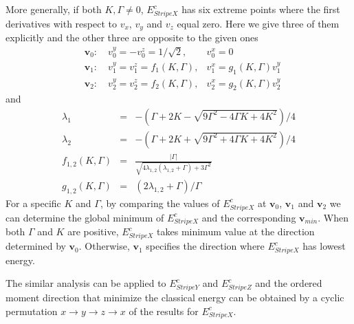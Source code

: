 \documentclass[aps,prb,reprint,amsfonts,amsmath,amssymb,showpacs,groupedaddress,superscriptaddress]{revtex4-1}
\begin{document}
More generally, if both $K, \Gamma \neq 0$, $E_{StripeX}^{c}$ has six extreme points where the first derivatives with respect to $v_x$, $v_y$ and $v_z$ equal zero. Here we give three of them explicitly and the other three are opposite to the given ones
\begin{subequations}
    \begin{eqnarray}
        & \bm{v}_0: \quad v_{0}^{y}=-v_{0}^{z} = 1/\sqrt{2}, & v_{0}^{x} = 0 \\
        & \bm{v}_1: \quad v_{1}^{y}=v_{1}^{z} = f_{1}(K, \Gamma), & v_{1}^{x} = g_{1}(K, \Gamma) v_{1}^{y} \\
        & \bm{v}_2: \quad v_{2}^{y}=v_{2}^{z} = f_{2}(K, \Gamma), & v_{2}^{x} = g_{2}(K, \Gamma) v_{2}^{y}
    \end{eqnarray}
\end{subequations}
and
\begin{subequations}
    \begin{eqnarray}
        \lambda_{1} & = &- (\Gamma +2 K - \sqrt{9\Gamma^2 - 4 \Gamma K + 4 K^2}) / 4 \nonumber \\
        \lambda_{2} & = & -(\Gamma +2 K + \sqrt{9\Gamma^2 + 4 \Gamma K + 4 K^2}) / 4 \nonumber \\
        f_{1,2}(K, \Gamma) & = & \frac{|\Gamma|}{\sqrt{4 \lambda_{1,2} (\lambda_{1,2} + \Gamma) + 3 \Gamma^{2}}} \\
        g_{1,2}(K, \Gamma) & = & (2 \lambda_{1,2} + \Gamma) / \Gamma
    \end{eqnarray}
\end{subequations}
For a specific $K$ and $\Gamma$, by comparing the values of $E_{StripeX}^{c}$ at $\bm{v}_0$, $\bm{v}_1$ and $\bm{v}_2$ we can determine the global minimum of $E_{StripeX}^{c}$ and the corresponding $\bm{v}_{min}$. When both $\Gamma$ and $K$ are positive, $E_{StripeX}^{c}$ takes minimum value at the direction determined by $\bm{v}_0$. Otherwise, $\bm{v}_1$ specifies the direction where $E_{StripeX}^{c}$ has lowest energy.

The similar analysis can be applied to $E_{StripeY}^{c}$ and $E_{StripeZ}^{c}$ and the ordered moment direction that minimize the classical energy can be obtained by a cyclic permutation $x \rightarrow y \rightarrow z \rightarrow x$ of the results for $E_{StripeX}^{c}$.

\newpage


\end{document}

